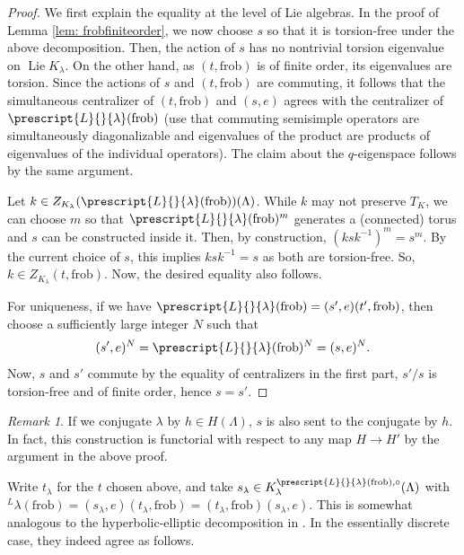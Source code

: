\documentclass{amsart}
\theoremstyle{definition}
\theoremstyle{remark}
\newtheorem{remark}[theorem]{Remark}
\numberwithin{equation}{section}
\DeclareMathOperator{\Lie}{Lie}
\newcommand{\co}[1]{\prescript{#1}{}}
\newcommand{\frob}{\mathrm{frob}}
\begin{document}
\begin{proof}
We first explain the equality at the level of Lie algebras. In the proof of Lemma \ref{lem: frobfiniteorder}, we now choose $s$ so that it is torsion-free under the above decomposition. Then, the action of $s$ has no nontrivial torsion eigenvalue on $\Lie K_\lambda$. On the other hand, as $(t, \frob)$ is of finite order, its eigenvalues are torsion. Since the actions of $s$ and $(t, \frob)$ are commuting, it follows that the simultaneous centralizer of $(t, \frob)$ and $(s,e)$ agrees with the centralizer of $\co{L}{\lambda}(\frob)$ (use that commuting semisimple operators are simultaneously diagonalizable and eigenvalues of the product are products of eigenvalues of the individual operators). The claim about the $q$-eigenspace follows by the same argument. 

Let $k\in Z_{K_\lambda} (\co{L}{\lambda}(\frob))(\Lambda)$. While $k$ may not preserve $T_K$, we can choose $m$ so that $\co{L}{\lambda}(\frob)^m$ generates a (connected) torus and $s$ can be constructed inside it. Then, by construction, $(ksk^{-1})^m=s^m$. By the current choice of $s$, this implies $ksk^{-1}=s$ as both are torsion-free. So, $k\in Z_{K_\lambda} (t, \frob)$. Now, the desired equality also follows. 

For uniqueness, if we have $\co{L}{\lambda}(\frob) = (s', e)(t', \frob)$, then choose a sufficiently large integer $N$ such that
\begin{equation*}
    (s', e)^N = \co{L}{\lambda}(\frob)^N = (s, e)^N.
\end{equation*}
Now, $s$ and $s'$ commute by the equality of centralizers in the first part, $s'/s$ is torsion-free and of finite order, hence $s=s'$.
\end{proof}

\begin{remark}
If we conjugate $\lambda$ by $h\in H(\Lambda)$, $s$ is also sent to the conjugate by $h$. In fact, this construction is functorial with respect to any map $H\to H'$ by the argument in the above proof. 
\end{remark}

Write $t_{\lambda}$ for the $t$ chosen above, and take $s_\lambda \in K_\lambda^{\co{L}{\lambda}(\frob), \circ}(\Lambda)$ with ${}^L \lambda(\frob)=(s_\lambda, e)(t_\lambda, \frob)=(t_\lambda, \frob)(s_\lambda, e)$. This is somewhat analogous to the hyperbolic-elliptic decomposition in \cite[\S 3.3]{CFMMX}. In the essentially discrete case, they indeed agree as follows. 
\end{document}
